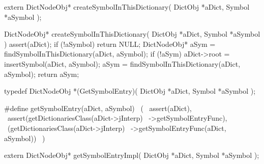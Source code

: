 \startTestSuite[createSymbolInThisDictionary]

\startCHeader
extern DictNodeObj* createSymbolInThisDictionary(
  DictObj *aDict,
  Symbol  *aSymbol
);
\stopCHeader
{}

\startCCode
DictNodeObj* createSymbolInThisDictionary(
  DictObj *aDict,
  Symbol  *aSymbol
) {
  assert(aDict);
  if (!aSymbol) return NULL;
  DictNodeObj* aSym =
    findSymbolInThisDictionary(aDict, aSymbol);
  if (!aSym) {
    aDict->root = insertSymbol(aDict, aSymbol);
    aSym = findSymbolInThisDictionary(aDict, aSymbol);
  }
  return aSym;
}
\stopCCode
\stopTestSuite

\startTestSuite[getSymbolEntry]

\startCHeader
typedef DictNodeObj *(GetSymbolEntry)(
  DictObj *aDict,
  Symbol  *aSymbol
);

#define getSymbolEntry(aDict, aSymbol)          \
  (                                             \
    assert(aDict),                              \
    assert(getDictionariesClass(aDict->jInterp) \
      ->getSymbolEntryFunc),                    \
    (getDictionariesClass(aDict->jInterp)       \
      ->getSymbolEntryFunc(aDict, aSymbol))     \
  )
\stopCHeader

\setCHeaderStream{private}
\startCHeader
extern DictNodeObj* getSymbolEntryImpl(
  DictObj *aDict,
  Symbol  *aSymbol
);
\stopCHeader
\setCHeaderStream{public}

